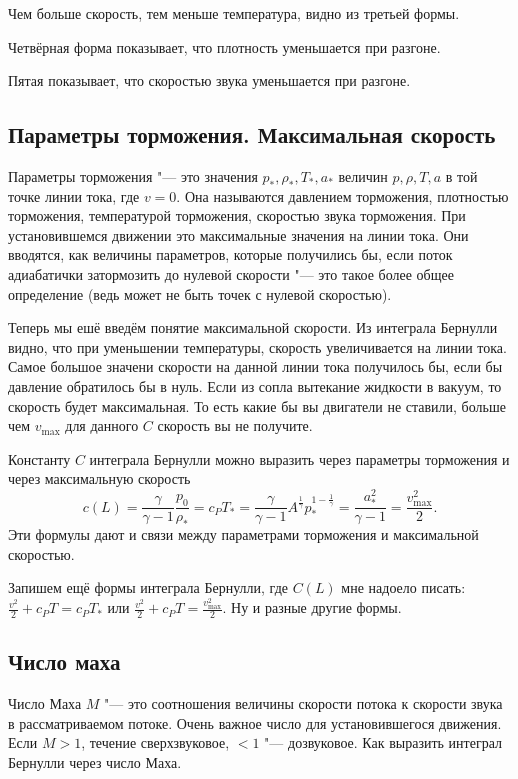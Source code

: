 Чем больше скорость, тем меньше температура, видно из третьей формы.

Четвёрная форма показывает, что плотность уменьшается при разгоне.

Пятая показывает, что скоростью звука уменьшается при разгоне.

\subsection{Параметры торможения. Максимальная скорость}
Параметры торможения "--- это значения $p_*,\rho_*,T_*, a_*$ величин $p,\rho,T, a$ в той точке линии тока, где $v=0$. Она называются давлением торможения, плотностью торможения, температурой торможения, скоростью звука торможения. При установившемся движении это максимальные значения на линии тока. Они вводятся, как величины параметров, которые получились бы, если поток адиабатички затормозить до нулевой скорости "--- это такое более общее определение (ведь может не быть точек с нулевой скоростью).

Теперь мы ешё введём понятие максимальной скорости. Из интеграла Бернулли видно, что при уменьшении температуры, скорость увеличивается на линии тока. Самое большое значени скорости на данной линии тока получилось бы, если бы давление обратилось бы в нуль. Если из сопла вытекание жидкости в вакуум, то скорость будет максимальная. То есть какие бы вы двигатели не ставили, больше чем $v_{\max}$ для данного $C$ скорость вы не получите.

Константу $C$ интеграла Бернулли можно выразить через параметры торможения и через максимальную скорость
\begin{equation}
c(L) = \frac{\gamma}{\gamma-1}\frac {p_0}{\rho_*}=c_PT_* =\frac{\gamma}{\gamma-1}A^{\frac1\gamma}p_*^{1-\frac1\gamma} = \frac{a_*^2}{\gamma-1} = \frac{v_{\max}^2}2.
\end{equation}
Эти формулы дают и связи между параметрами торможения и максимальной скоростью.

Запишем ещё формы интеграла Бернулли, где $C(L)$ мне надоело писать: $\frac{v^2}2 + c_P T = c_P T_*$ или $\frac{v^2}2+c_P T = \frac{v_{\max}^2}2$. Ну и разные другие формы.

\subsection{Число маха}
Число Маха $M$ "--- это соотношения величины скорости потока к скорости звука в рассматриваемом потоке. Очень важное число для установившегося движения. Если $M>1$, течение сверхзвуковое, $<1$ "--- дозвуковое. Как выразить интеграл Бернулли через число Маха.

